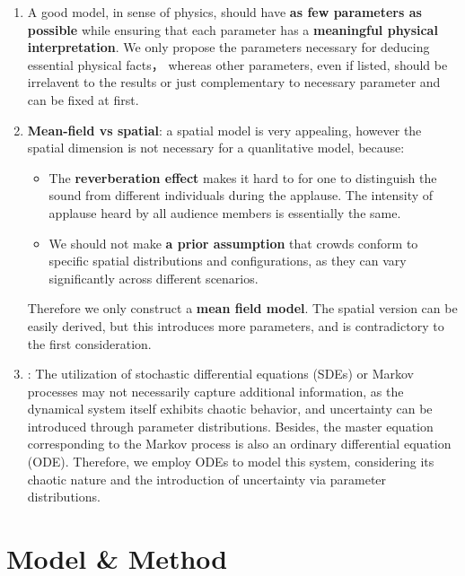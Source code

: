 \documentclass[UTF8,a4paper,11pt]{ctexart}
\begin{document}
\begin{enumerate}
    \item A good model, in sense of physics, should have \textbf{as few parameters as possible} while ensuring that each parameter has a \textbf{meaningful physical interpretation}. We only propose the parameters necessary for deducing essential physical facts， whereas other parameters, even if listed, should be irrelavent to the results or just complementary to necessary parameter and can be fixed at first.
    \item \textbf{Mean-field vs spatial}: a spatial model is very appealing, however the spatial dimension is not necessary for a quanlitative model, because:
        \begin{itemize}
            \item The \textbf{reverberation effect} makes it hard to for one to distinguish the sound from different individuals during the applause. The intensity of applause heard by all audience members is essentially the same.
            \item We should not make \textbf{a prior assumption} that crowds conform to specific spatial distributions and configurations, as they can vary significantly across different scenarios.
        \end{itemize}
        Therefore we only construct a \textbf{mean field model}. The spatial version can be easily derived, but this introduces more parameters, and is contradictory to the first consideration.
    \item {}: 
        The utilization of stochastic differential equations (SDEs) or Markov processes may not necessarily capture additional information, as the dynamical system itself exhibits chaotic behavior, and uncertainty can be introduced through parameter distributions. Besides, the master equation corresponding to the Markov process is also an ordinary differential equation (ODE). Therefore, we employ ODEs to model this system, considering its chaotic nature and the introduction of uncertainty via parameter distributions.
\end{enumerate}

\section{Model \& Method}
\end{document}
